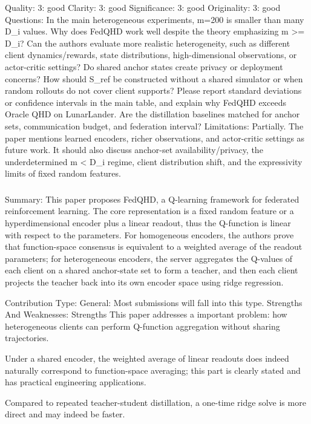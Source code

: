 Quality: 3: good
Clarity: 3: good
Significance: 3: good
Originality: 3: good
Questions:
In the main heterogeneous experiments, m=200 is smaller than many D_i values. Why does FedQHD work well despite the theory emphasizing m >= D_i?
Can the authors evaluate more realistic heterogeneity, such as different client dynamics/rewards, state distributions, high-dimensional observations, or actor-critic settings?
Do shared anchor states create privacy or deployment concerns? How should S_ref be constructed without a shared simulator or when random rollouts do not cover client supports?
Please report standard deviations or confidence intervals in the main table, and explain why FedQHD exceeds Oracle QHD on LunarLander.
Are the distillation baselines matched for anchor sets, communication budget, and federation interval?
Limitations:
Partially. The paper mentions learned encoders, richer observations, and actor-critic settings as future work. It should also discuss anchor-set availability/privacy, the underdetermined m < D_i regime, client distribution shift, and the expressivity limits of fixed random features.

\subsubsection{}
Summary:
This paper proposes FedQHD, a Q-learning framework for federated reinforcement learning. The core representation is a fixed random feature or a hyperdimensional encoder plus a linear readout, thus the Q-function is linear with respect to the parameters. For homogeneous encoders, the authors prove that function-space consensus is equivalent to a weighted average of the readout parameters; for heterogeneous encoders, the server aggregates the Q-values ​​of each client on a shared anchor-state set to form a teacher, and then each client projects the teacher back into its own encoder space using ridge regression.

Contribution Type: General: Most submissions will fall into this type.
Strengths And Weaknesses:
Strengths
This paper addresses a important problem: how heterogeneous clients can perform Q-function aggregation without sharing trajectories.

Under a shared encoder, the weighted average of linear readouts does indeed naturally correspond to function-space averaging; this part is clearly stated and has practical engineering applications.

Compared to repeated teacher-student distillation, a one-time ridge solve is more direct and may indeed be faster.

